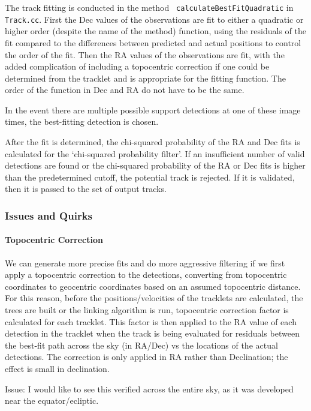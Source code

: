The track fitting is conducted in the method {\tt
  calculateBestFitQuadratic} in {\tt Track.cc}. First the Dec values
of the observations are fit to either a quadratic or higher order
(despite the name of the method) function, using the residuals of the
fit compared to the differences between predicted and actual positions to
control the order of the fit. Then the RA values of the observations
are fit, with the added complication of including a topocentric
correction if one could be determined from the tracklet and is
appropriate for the fitting function. The order of the function in Dec
and RA do not have to be the same.  

In the event there are multiple possible support detections at one of
these image times, the best-fitting detection is chosen. 

After the fit is determined, the chi-squared probability of the RA and
Dec fits is calculated for the `chi-squared probability filter'.  If
an insufficient number of valid detections are found or the
chi-squared probability of the RA or Dec fits is higher than the
predetermined cutoff, the potential track is rejected.  If it is
validated, then it is passed to the set of output tracks.

\subsubsection{Issues and Quirks}
\label{someLinkingIssues}

\paragraph{Topocentric Correction}
We can generate more precise fits and do more aggressive filtering if we first apply a
topocentric correction to the detections, converting from topocentric
coordinates to geocentric coordinates based on an assumed topocentric
distance.  For this reason, before the positions/velocities of the
tracklets are calculated, the trees are built or the linking algorithm
is run, topocentric correction factor is calculated for each
tracklet. This factor is then applied to the RA value of each detection in the
tracklet when the track is being evaluated for residuals between the
best-fit path across the sky (in RA/Dec) vs the locations of the
actual detections.  The correction is only applied in RA rather than
Declination; the effect is small in declination. 

Issue: I would like to see this verified across the entire sky, as it
was developed near the equator/ecliptic. 


